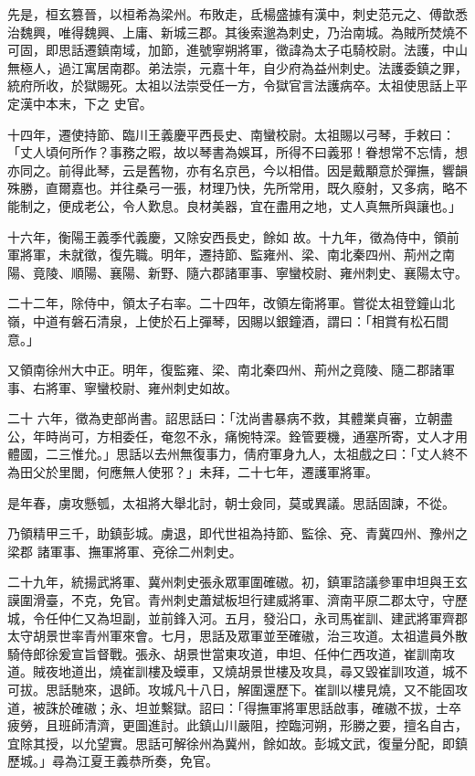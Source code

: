 \begin{pinyinscope}
 先是，桓玄篡晉，以桓希為梁州。布敗走，氐楊盛據有漢中，刺史范元之、傅歆悉治魏興，唯得魏興、上庸、新城三郡。其後索邈為刺史，乃治南城。為賊所焚燒不可固，即思話遷鎮南域，加節，進號寧朔將軍，徵諱為太子屯騎校尉。法護，中山無極人，過江寓居南郡。弟法崇，元嘉十年，自少府為益州刺史。法護委鎮之罪，統府所收，於獄賜死。太祖以法崇受任一方，令獄官言法護病卒。太祖使思話上平定漢中本末，下之
 史官。



 十四年，遷使持節、臨川王義慶平西長史、南蠻校尉。太祖賜以弓琴，手敕曰：「丈人頃何所作？事務之暇，故以琴書為娛耳，所得不曰義邪！眷想常不忘情，想亦同之。前得此琴，云是舊物，亦有名京邑，今以相借。因是戴顒意於彈撫，響韻殊勝，直爾嘉也。并往桑弓一張，材理乃快，先所常用，既久廢射，又多病，略不能制之，便成老公，令人歎息。良材美器，宜在盡用之地，丈人真無所與讓也。」



 十六年，衡陽王義季代義慶，又除安西長史，餘如
 故。十九年，徵為侍中，領前軍將軍，未就徵，復先職。明年，遷持節、監雍州、梁、南北秦四州、荊州之南陽、竟陵、順陽、襄陽、新野、隨六郡諸軍事、寧蠻校尉、雍州刺史、襄陽太守。



 二十二年，除侍中，領太子右率。二十四年，改領左衛將軍。嘗從太祖登鐘山北嶺，中道有磐石清泉，上使於石上彈琴，因賜以銀鐘酒，謂曰：「相賞有松石間意。」



 又領南徐州大中正。明年，復監雍、梁、南北秦四州、荊州之竟陵、隨二郡諸軍事、右將軍、寧蠻校尉、雍州刺史如故。



 二十
 六年，徵為吏部尚書。詔思話曰：「沈尚書暴病不救，其體業貞審，立朝盡公，年時尚可，方相委任，奄忽不永，痛惋特深。銓管要機，通塞所寄，丈人才用體國，二三惟允。」思話以去州無復事力，倩府軍身九人，太祖戲之曰：「丈人終不為田父於里閭，何應無人使邪？」未拜，二十七年，遷護軍將軍。



 是年春，虜攻懸瓠，太祖將大舉北討，朝士僉同，莫或異議。思話固諫，不從。



 乃領精甲三千，助鎮彭城。虜退，即代世祖為持節、監徐、兗、青冀四州、豫州之梁郡
 諸軍事、撫軍將軍、兗徐二州刺史。



 二十九年，統揚武將軍、冀州刺史張永眾軍圍確磝。初，鎮軍諮議參軍申坦與王玄謨圍滑臺，不克，免官。青州刺史蕭斌板坦行建威將軍、濟南平原二郡太守，守歷城，令任仲仁又為坦副，並前鋒入河。五月，發沿口，永司馬崔訓、建武將軍齊郡太守胡景世率青州軍來會。七月，思話及眾軍並至確磝，治三攻道。太祖遣員外散騎侍郎徐爰宣旨督戰。張永、胡景世當東攻道，申坦、任仲仁西攻道，崔訓南攻
 道。賊夜地道出，燒崔訓樓及蟆車，又燒胡景世樓及攻具，尋又毀崔訓攻道，城不可拔。思話馳來，退師。攻城凡十八日，解圍還歷下。崔訓以樓見燒，又不能固攻道，被誅於確磝；永、坦並繫獄。詔曰：「得撫軍將軍思話啟事，確磝不拔，士卒疲勞，且班師清濟，更圖進討。此鎮山川嚴阻，控臨河朔，形勝之要，擅名自古，宜除其授，以允望實。思話可解徐州為冀州，餘如故。彭城文武，復量分配，即鎮歷城。」尋為江夏王義恭所奏，免官。




\end{pinyinscope}
